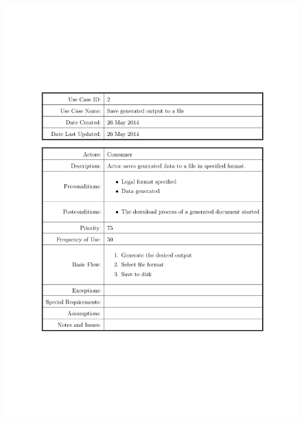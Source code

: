 \documentclass[a4paper]{tufte-book}
\begin{document}
\begin{figure}[h] \includegraphics[width=\linewidth]{Requirements/UseCases/002_SaveOutput2File.pdf}\end{figure}
\end{document}
